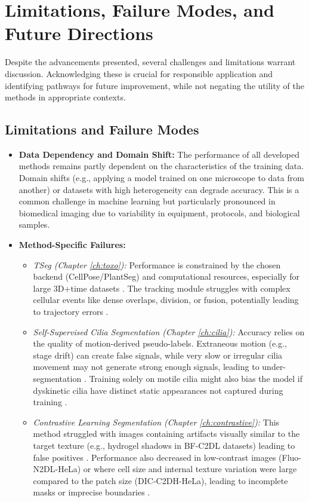 \documentclass[./dissertation.tex]{subfiles}
\begin{document}
\section{Limitations, Failure Modes, and Future Directions}
\label{sec:conclusion_limitations} %
Despite the advancements presented, several challenges and limitations warrant discussion. Acknowledging these is crucial for responsible application and identifying pathways for future improvement, while not negating the utility of the methods in appropriate contexts.

\subsection*{Limitations and Failure Modes} %
\begin{itemize}
    \item \textbf{Data Dependency and Domain Shift:} The performance of all developed methods remains partly dependent on the characteristics of the training data. Domain shifts (e.g., applying a model trained on one microscope to data from another) or datasets with high heterogeneity can degrade accuracy. This is a common challenge in machine learning but particularly pronounced in biomedical imaging due to variability in equipment, protocols, and biological samples.
    \item \textbf{Method-Specific Failures:}
          \begin{itemize}
              \item \textit{TSeg (Chapter \ref{ch:toxo}):} Performance is constrained by the chosen backend (CellPose/PlantSeg) and computational resources, especially for large 3D+time datasets \cite{dissertation.pdf}. The tracking module struggles with complex cellular events like dense overlaps, division, or fusion, potentially leading to trajectory errors \cite{dissertation.pdf}.
              \item \textit{Self-Supervised Cilia Segmentation (Chapter \ref{ch:cilia}):} Accuracy relies on the quality of motion-derived pseudo-labels. Extraneous motion (e.g., stage drift) can create false signals, while very slow or irregular cilia movement may not generate strong enough signals, leading to under-segmentation \cite{dissertation.pdf}. Training solely on motile cilia might also bias the model if dyskinetic cilia have distinct static appearances not captured during training \cite{dissertation.pdf}.
              \item \textit{Contrastive Learning Segmentation (Chapter \ref{ch:contrastive}):} This method struggled with images containing artifacts visually similar to the target texture (e.g., hydrogel shadows in BF-C2DL datasets) leading to false positives \cite{dissertation.pdf}. Performance also decreased in low-contrast images (Fluo-N2DL-HeLa) or where cell size and internal texture variation were large compared to the patch size (DIC-C2DH-HeLa), leading to incomplete masks or imprecise boundaries \cite{dissertation.pdf}.

\end{itemize}
\end{itemize}
\end{document}
